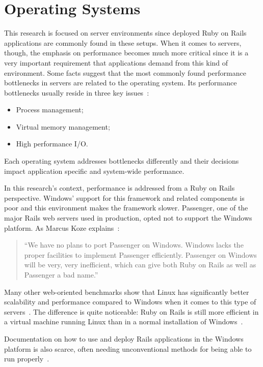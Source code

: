 \section{Operating Systems} %
\label{state:sec:operating_systems}

This research is focused on server environments since deployed Ruby on Rails applications are commonly found in these setups. When it comes to servers, though, the emphasis on performance becomes much more critical since it is a very important requirement that applications demand from this kind of environment. Some facts suggest that the most commonly found performance bottlenecks in servers are related to the operating system. Its performance bottlenecks usually reside in three key issues~\cite{os_performance_server}:
\begin{itemize}
\item Process management;
\item Virtual memory management;
\item High performance I/O.
\end{itemize}
Each operating system addresses bottlenecks differently and their decisions impact application specific and system-wide performance.

In this research's context, performance is addressed from a Ruby on Rails perspective. Windows' support for this framework and related components is poor and this environment makes the framework slower. Passenger, one of the major Rails web servers used in production, opted not to support the Windows platform. As Marcus Koze explains~\cite{marcus_koze_passenger}:
\begin{quote}
  ``We have no plans to port Passenger on Windows. Windows lacks the proper facilities to implement Passenger efficiently. Passenger on Windows will be very, very inefficient, which can give both Ruby on Rails as well as Passenger a bad name.''
\end{quote}
Many other web-oriented benchmarks show that Linux has significantly better scalability and performance compared to Windows when it comes to this type of servers~\cite{apache_tomcat_performance_linux_windows, php_apache_linux_windows}. The difference is quite noticeable: Ruby on Rails is still more efficient in a virtual machine running Linux than in a normal installation of Windows~\cite{linux_virtualbox_windows_rails}.

Documentation on how to use and deploy Rails applications in the Windows platform is also scarce, often needing unconventional methods for being able to run properly~\cite{rails_windows}.

